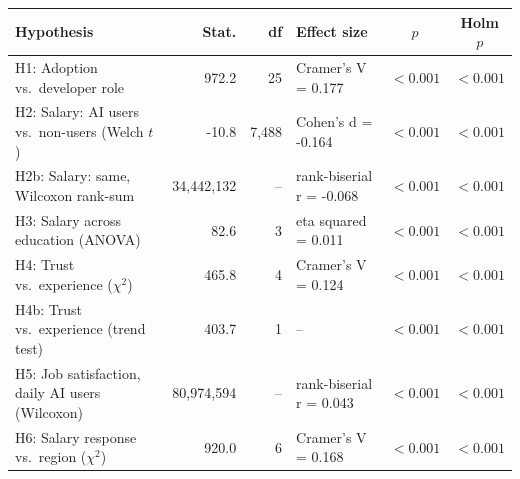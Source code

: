 \begin{tabular}{p{3.9cm}rrp{2.5cm}cc}
\toprule
\textbf{Hypothesis} & \textbf{Stat.} & \textbf{df} & \textbf{Effect size} & \textbf{$p$} & \textbf{Holm $p$} \\
\midrule
H1: Adoption vs.\ developer role & 972.2 & 25 & Cramer's V = 0.177 & $<0.001$ & $<0.001$ \\
H2: Salary: AI users vs.\ non-users (Welch $t$) & -10.8 & 7,488 & Cohen's d = -0.164 & $<0.001$ & $<0.001$ \\
H2b: Salary: same, Wilcoxon rank-sum & 34,442,132 & -- & rank-biserial r = -0.068 & $<0.001$ & $<0.001$ \\
H3: Salary across education (ANOVA) & 82.6 & 3 & eta squared = 0.011 & $<0.001$ & $<0.001$ \\
H4: Trust vs.\ experience ($\chi^2$) & 465.8 & 4 & Cramer's V = 0.124 & $<0.001$ & $<0.001$ \\
H4b: Trust vs.\ experience (trend test) & 403.7 & 1 & -- & $<0.001$ & $<0.001$ \\
H5: Job satisfaction, daily AI users (Wilcoxon) & 80,974,594 & -- & rank-biserial r = 0.043 & $<0.001$ & $<0.001$ \\
H6: Salary response vs.\ region ($\chi^2$) & 920.0 & 6 & Cramer's V = 0.168 & $<0.001$ & $<0.001$ \\
\bottomrule
\end{tabular}
